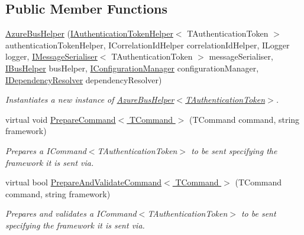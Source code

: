 \subsection*{Public Member Functions}
\begin{DoxyCompactItemize}
\item 
\hyperlink{classCqrs_1_1Azure_1_1ServiceBus_1_1AzureBusHelper_af4ca8255d3eb87180c5e24996e1f6e15_af4ca8255d3eb87180c5e24996e1f6e15}{Azure\+Bus\+Helper} (\hyperlink{interfaceCqrs_1_1Authentication_1_1IAuthenticationTokenHelper}{I\+Authentication\+Token\+Helper}$<$ T\+Authentication\+Token $>$ authentication\+Token\+Helper, I\+Correlation\+Id\+Helper correlation\+Id\+Helper, I\+Logger logger, \hyperlink{interfaceCqrs_1_1Azure_1_1ServiceBus_1_1IMessageSerialiser}{I\+Message\+Serialiser}$<$ T\+Authentication\+Token $>$ message\+Serialiser, \hyperlink{interfaceCqrs_1_1Bus_1_1IBusHelper}{I\+Bus\+Helper} bus\+Helper, \hyperlink{interfaceCqrs_1_1Configuration_1_1IConfigurationManager}{I\+Configuration\+Manager} configuration\+Manager, \hyperlink{interfaceCqrs_1_1Configuration_1_1IDependencyResolver}{I\+Dependency\+Resolver} dependency\+Resolver)
\begin{DoxyCompactList}\small\item\em Instantiates a new instance of \hyperlink{classCqrs_1_1Azure_1_1ServiceBus_1_1AzureBusHelper_af4ca8255d3eb87180c5e24996e1f6e15_af4ca8255d3eb87180c5e24996e1f6e15}{Azure\+Bus\+Helper$<$\+T\+Authentication\+Token$>$}. \end{DoxyCompactList}\item 
virtual void \hyperlink{classCqrs_1_1Azure_1_1ServiceBus_1_1AzureBusHelper_abdcc74e09f97a259f16d04e2af454002_abdcc74e09f97a259f16d04e2af454002}{Prepare\+Command$<$ T\+Command $>$} (T\+Command command, string framework)
\begin{DoxyCompactList}\small\item\em Prepares a I\+Command$<$\+T\+Authentication\+Token$>$ to be sent specifying the framework it is sent via. \end{DoxyCompactList}\item 
virtual bool \hyperlink{classCqrs_1_1Azure_1_1ServiceBus_1_1AzureBusHelper_a4d03f55a58a018fbbf6fd518ad9b24f8_a4d03f55a58a018fbbf6fd518ad9b24f8}{Prepare\+And\+Validate\+Command$<$ T\+Command $>$} (T\+Command command, string framework)
\begin{DoxyCompactList}\small\item\em Prepares and validates a I\+Command$<$\+T\+Authentication\+Token$>$ to be sent specifying the framework it is sent via. \end{DoxyCompactList}\item 

\end{DoxyCompactItemize}
